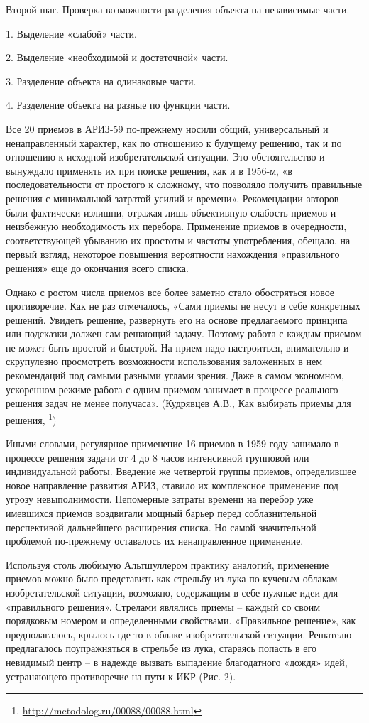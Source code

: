 \documentclass[11pt,a4paper]{article}
\begin{document}
Второй шаг. Проверка возможности разделения объекта на независимые части.

1. Выделение «слабой» части.

2. Выделение «необходимой и достаточной» части.

3. Разделение объекта на одинаковые части.

4. Разделение объекта на разные по функции части.

Все 20 приемов в АРИЗ-59 по-прежнему носили общий, универсальный и
ненаправленный характер, как по отношению к будущему решению, так и по
отношению к исходной изобретательской ситуации. Это обстоятельство и вынуждало
применять их при поиске решения, как и в 1956-м, «в последовательности от
простого к сложному, что позволяло получить правильные решения с минимальной
затратой усилий и времени». Рекомендации авторов были фактически излишни,
отражая лишь объективную слабость приемов и неизбежную необходимость их
перебора. Применение приемов в очередности, соответствующей убыванию их
простоты и частоты употребления, обещало, на первый взгляд, некоторое
повышения вероятности нахождения «правильного решения» еще до окончания всего
списка.

Однако с ростом числа приемов все более заметно стало обостряться новое
противоречие. Как не раз отмечалось, «Сами приемы не несут в себе конкретных
решений. Увидеть решение, развернуть его на основе предлагаемого принципа или
подсказки должен сам решающий задачу. Поэтому работа с каждым приемом не может
быть простой и быстрой. На прием надо настроиться, внимательно и скрупулезно
просмотреть возможности использования заложенных в нем рекомендаций под самыми
разными углами зрения. Даже в самом экономном, ускоренном режиме работа с
одним приемом занимает в процессе реального решения задач не менее
получаса». (Кудрявцев А.В., Как выбирать приемы для решения,
\footnote{\url{http://metodolog.ru/00088/00088.html}})

Иными словами, регулярное применение 16 приемов в 1959 году занимало в
процессе решения задачи от 4 до 8 часов интенсивной групповой или
индивидуальной работы. Введение же четвертой группы приемов, определившее
новое направление развития АРИЗ, ставило их комплексное применение под угрозу
невыполнимости. Непомерные затраты времени на перебор уже имевшихся приемов
воздвигали мощный барьер перед соблазнительной перспективой дальнейшего
расширения списка. Но самой значительной проблемой по-прежнему оставалось их
ненаправленное применение.

Используя столь любимую Альтшуллером практику аналогий, применение приемов
можно было представить как стрельбу из лука по кучевым облакам
изобретательской ситуации, возможно, содержащим в себе нужные идеи для
«правильного решения». Стрелами являлись приемы -- каждый со своим порядковым
номером и определенными свойствами. «Правильное решение», как предполагалось,
крылось где-то в облаке изобретательской ситуации. Решателю предлагалось
поупражняться в стрельбе из лука, стараясь попасть в его невидимый центр -- в
надежде вызвать выпадение благодатного «дождя» идей, устраняющего противоречие
на пути к ИКР (Рис. 2).
\end{document}
